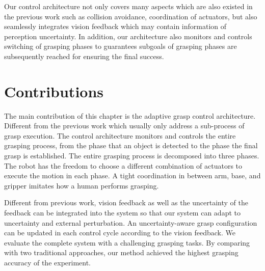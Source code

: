 Our control architecture not only covers many aspects which are also existed in the previous work such as collision avoidance, coordination of actuators, but also seamlessly integrates vision feedback which may contain information of perception uncertainty. In addition, our architecture also monitors and controls switching of grasping phases to guarantees subgoals of grasping phases are subsequently reached for ensuring the final success.

\section{Contributions}
The main contribution of this chapter is the adaptive grasp control architecture. Different from the previous work which usually only address a sub-process of grasp execution. The control architecture monitors and controls the entire grasping process, from the phase that an object is detected to the phase the final grasp is established. The entire grasping process is decomposed into three phases. The robot has the freedom to choose a different combination of actuators to execute the motion in each phase. A tight coordination in between arm, base, and gripper imitates how a human performs grasping. 

Different from previous work, vision feedback as well as the uncertainty of the feedback can be integrated into the system so that our system can adapt to uncertainty and external perturbation. An uncertainty-aware grasp configuration can be updated in each control cycle according to the vision feedback. We evaluate the complete system with a challenging grasping tasks. By comparing with two traditional approaches, our method achieved the highest grasping accuracy of the experiment. 


